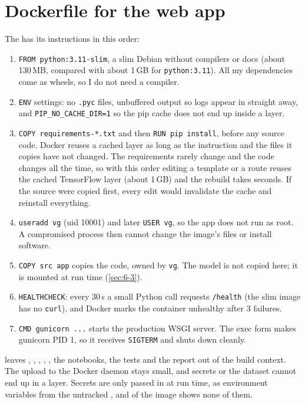 \section{Dockerfile for the web app}\label{sec:6-2}
The \href{\GitHubURL/blob/main/Dockerfile}{} has its instructions in this order:
\begin{enumerate}
\item \texttt{FROM python:3.11-slim}, a slim Debian without compilers or docs (about 130\,MB,
compared with about 1\,GB for \texttt{python:3.11}). All my dependencies come as wheels, so I do not
need a compiler.
\item \texttt{ENV} settings: no \texttt{.pyc} files, unbuffered output so logs appear in
 straight away, and \texttt{PIP\_NO\_CACHE\_DIR=1} so the pip cache does not end
up inside a layer.
\item \texttt{COPY requirements-*.txt} and then \texttt{RUN pip install}, before any source code.
Docker reuses a cached layer as long as the instruction and the files it copies have not changed.
The requirements rarely change and the code changes all the time, so with this order editing a
template or a route reuses the cached TensorFlow layer (about 1\,GB) and the rebuild takes seconds.
If the source were copied first, every edit would invalidate the cache and reinstall everything.
\item \texttt{useradd vg} (uid 10001) and later \texttt{USER vg}, so the app does not run as root.
A compromised process then cannot change the image's files or install software.
\item \texttt{COPY src app} copies the code, owned by \texttt{vg}. The model is not copied here;
it is mounted at run time (\cref{sec:6-3}).
\item \texttt{HEALTHCHECK}: every 30\,s a small Python call requests \texttt{/health} (the slim
image has no \texttt{curl}), and Docker marks the container unhealthy after 3 failures.
\item \texttt{CMD gunicorn ...} starts the production WSGI server. The exec form makes gunicorn
PID 1, so it receives \texttt{SIGTERM} and shuts down cleanly.
\end{enumerate}
 leaves , , , ,
, the notebooks, the tests and the report out of the build context. The upload to
the Docker daemon stays small, and secrets or the dataset cannot end up in a layer. Secrets are
only passed in at run time, as environment variables from the untracked , and
 of the image shows none of them.

